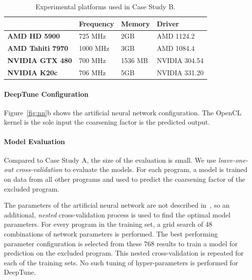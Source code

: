 \begin{table}[t!]
  \centering %
  \begin{tabular}{| l l l l |}
    \hline
    \rowcolor{gray!50}
    & \textbf{Frequency} & \textbf{Memory} & \textbf{Driver} \\
    \hline
    \textbf{AMD HD 5900} & 725 MHz & 2GB & AMD 1124.2 \\
    \textbf{AMD Tahiti 7970} & 1000 MHz & 3GB & AMD 1084.4 \\
    \textbf{NVIDIA GTX 480} & 700 MHz & 1536 MB & NVIDIA 304.54 \\
    \textbf{NVIDIA K20c} & 706 MHz & 5GB & NVIDIA 331.20 \\
    \hline
  \end{tabular}
  \caption[Experimental platforms used in Case Study B]{%
    Experimental platforms used in Case Study B.%
  }
  \label{tab:pact-platforms}
\end{table}


\paragraph*{DeepTune Configuration}

Figure~\ref{fig:nn}b shows the artificial neural network configuration. The OpenCL kernel is the sole input the coarsening factor is the predicted output.

\paragraph*{Model Evaluation}

Compared to Case Study A, the size of the evaluation is small. We use \emph{leave-one-out cross-validation} to evaluate the models. For each program, a model is trained on data from all other programs and used to predict the coarsening factor of the excluded program.

The parameters of the artificial neural network are not described in~\cite{Magni2014}, so an additional, \emph{nested} cross-validation process is used to find the optimal model parameters. For every program in the training set, a grid search of 48 combinations of network parameters is performed. The best performing parameter configuration is selected from these 768 results to train a model for prediction on the excluded program. This nested cross-validation is repeated for each of the training sets. No such tuning of hyper-parameters is performed for DeepTune.


